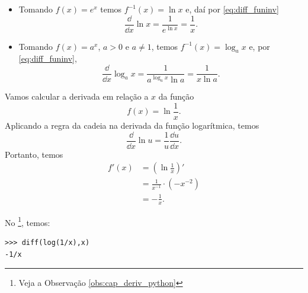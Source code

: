 \begin{obs}
  \begin{itemize}
  \item Tomando $f(x) = e^x$ temos $f^{-1}(x) = \ln x$ e, daí por \eqref{eq:diff_funinv}
    \begin{equation}
      \frac{\dd }{\dd x}\ln x = \frac{1}{e^{\ln x}} = \frac{1}{x}.
    \end{equation}
  \item Tomando $f(x) = a^x$, $a> 0$ e $a\neq 1$, temos $f^{-1}(x) = \log_a x$ e, por \eqref{eq:diff_funinv},
    \begin{equation}
      \frac{\dd}{\dd x}\log_a x = \frac{1}{a^{\log_a x}\ln a} = \frac{1}{x\ln a}.
    \end{equation}
  \end{itemize}
\end{obs}

\begin{ex}
  Vamos calcular a derivada em relação a $x$ da função
  \begin{equation}
    f(x) = \ln \frac{1}{x}.
  \end{equation}
  Aplicando a regra da cadeia na derivada da função logarítmica, temos
  \begin{equation}
    \frac{\dd}{\dd x}\ln u = \frac{1}{u}\frac{\dd u}{\dd x}.
  \end{equation}
  Portanto, temos
  \begin{align}
    f'(x) &= \left(\ln\frac{1}{x}\right)'\\
          &= \frac{1}{x^{-1}}\cdot (-x^{-2}) \\
          &= -\frac{1}{x}.
  \end{align}

  \ifispython
  No \sympy\footnote{Veja a Observação \ref{obs:cap_deriv_python}}, temos:
\begin{verbatim}
>>> diff(log(1/x),x)
-1/x
\end{verbatim}
  \fi  
\end{ex}

